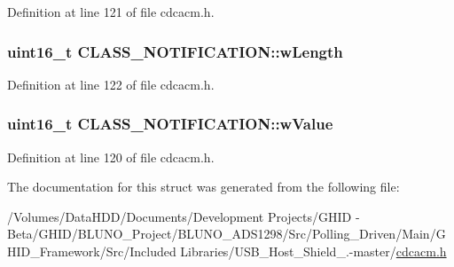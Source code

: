 \-Definition at line 121 of file cdcacm.\-h.

\hypertarget{struct_c_l_a_s_s___n_o_t_i_f_i_c_a_t_i_o_n_a7933669f6b6379d7ee0605f50422cbe2}{
\subsubsection[{w\-Length}]{\setlength{\rightskip}{0pt plus 5cm}uint16\-\_\-t {\bf \-C\-L\-A\-S\-S\-\_\-\-N\-O\-T\-I\-F\-I\-C\-A\-T\-I\-O\-N\-::w\-Length}}}\label{struct_c_l_a_s_s___n_o_t_i_f_i_c_a_t_i_o_n_a7933669f6b6379d7ee0605f50422cbe2}


\-Definition at line 122 of file cdcacm.\-h.

\hypertarget{struct_c_l_a_s_s___n_o_t_i_f_i_c_a_t_i_o_n_ab55dc65ad3f5b47da89beeaf7c03b4bc}{
\subsubsection[{w\-Value}]{\setlength{\rightskip}{0pt plus 5cm}uint16\-\_\-t {\bf \-C\-L\-A\-S\-S\-\_\-\-N\-O\-T\-I\-F\-I\-C\-A\-T\-I\-O\-N\-::w\-Value}}}\label{struct_c_l_a_s_s___n_o_t_i_f_i_c_a_t_i_o_n_ab55dc65ad3f5b47da89beeaf7c03b4bc}


\-Definition at line 120 of file cdcacm.\-h.



\-The documentation for this struct was generated from the following file\-:\begin{DoxyCompactItemize}
\item 
/\-Volumes/\-Data\-H\-D\-D/\-Documents/\-Development Projects/\-G\-H\-I\-D -\/ Beta/\-G\-H\-I\-D/\-B\-L\-U\-N\-O\-\_\-\-Project/\-B\-L\-U\-N\-O\-\_\-\-A\-D\-S1298/\-Src/\-Polling\-\_\-\-Driven/\-Main/\-G\-H\-I\-D\-\_\-\-Framework/\-Src/\-Included Libraries/\-U\-S\-B\-\_\-\-Host\-\_\-\-Shield\-\_.-\/master/\hyperlink{cdcacm_8h}{cdcacm.\-h}\end{DoxyCompactItemize}
